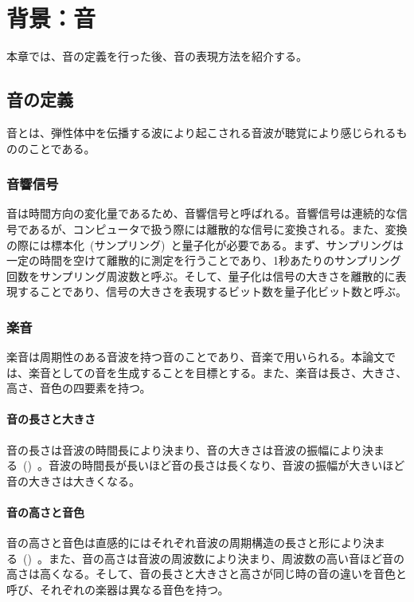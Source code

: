 \chapter{背景：音}

本章では、音の定義を行った後、音の表現方法を紹介する。

\section{音の定義}

音とは、弾性体中を伝播する波により起こされる音波が聴覚により感じられるもののことである。

\subsection{音響信号}

音は時間方向の変化量であるため、音響信号と呼ばれる。音響信号は連続的な信号であるが、コンピュータで扱う際には離散的な信号に変換される。また、変換の際には標本化~(サンプリング)~と量子化が必要である。まず、サンプリングは一定の時間を空けて離散的に測定を行うことであり、1秒あたりのサンプリング回数をサンプリング周波数と呼ぶ。そして、量子化は信号の大きさを離散的に表現することであり、信号の大きさを表現するビット数を量子化ビット数と呼ぶ。

\subsection{楽音}

楽音は周期性のある音波を持つ音のことであり、音楽で用いられる。本論文では、楽音としての音を生成することを目標とする。また、楽音は長さ、大きさ、高さ、音色の四要素を持つ。

\subsubsection{音の長さと大きさ}

音の長さは音波の時間長により決まり、音の大きさは音波の振幅により決まる~()~。音波の時間長が長いほど音の長さは長くなり、音波の振幅が大きいほど音の大きさは大きくなる。

\subsubsection{音の高さと音色}

音の高さと音色は直感的にはそれぞれ音波の周期構造の長さと形により決まる~()~。また、音の高さは音波の周波数により決まり、周波数の高い音ほど音の高さは高くなる。そして、音の長さと大きさと高さが同じ時の音の違いを音色と呼び、それぞれの楽器は異なる音色を持つ。

